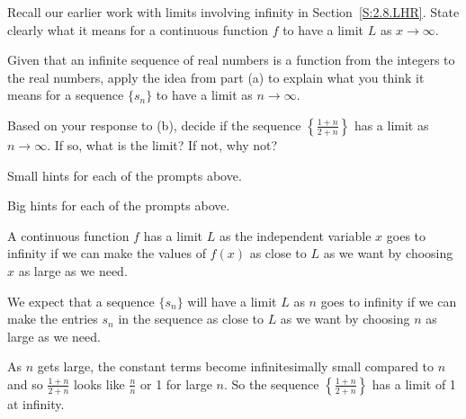 \begin{activity} \label{8.1.Act2}
\ba
\item Recall our earlier work with limits involving infinity in Section~\ref{S:2.8.LHR}.  State clearly what it means for a continuous function $f$ to have a limit $L$ as $x \to \infty$.

\item Given that an infinite sequence of real numbers is a function from the integers to the real numbers, apply the idea from part (a) to explain what you think it means for a sequence $\{s_n\}$ to have a limit as $n \to \infty$.  

\item Based on your response to (b), decide if the sequence $\left\{ \frac{1+n}{2+n}\right\}$ has a limit as $n \to \infty$. If so, what is the limit? If not, why not?

\ea
\end{activity}

\begin{smallhint}
\ba
	\item Small hints for each of the prompts above.
\ea
\end{smallhint}
\begin{bighint}
\ba
	\item Big hints for each of the prompts above.
\ea
\end{bighint}
\begin{activitySolution}
\ba
	\item A continuous function $f$ has a limit $L$ as the independent variable $x$ goes to infinity if we can make the values of $f(x)$ as close to $L$ as we want by choosing $x$ as large as we need. 
    \item We expect that a sequence $\{s_n\}$ will have a limit $L$ as $n$ goes to infinity if we can make the entries $s_n$ in the sequence as close to $L$ as we want by choosing $n$ as large as we need.
    \item As $n$ gets large, the constant terms become infinitesimally small compared to $n$ and so $\frac{1+n}{2+n}$ looks like $\frac{n}{n}$ or 1 for large $n$. So the sequence $\left\{ \frac{1+n}{2+n}\right\}$ has a limit of 1 at infinity.   
\ea
\end{activitySolution}
\aftera 